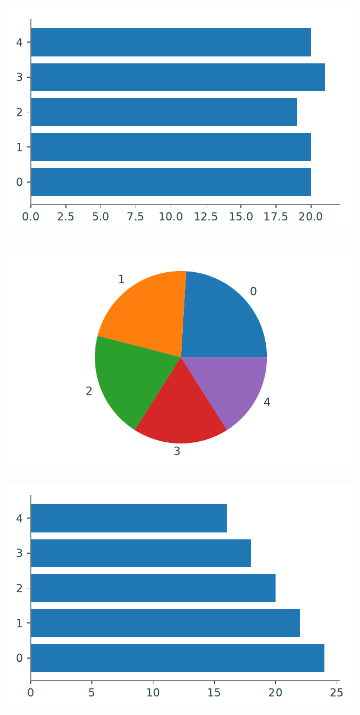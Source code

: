 \begin{figure}[H]
\begin{subfigure}{.49\textwidth}
    \end{subfigure}
    \begin{subfigure}{.49\textwidth}
        \centering
        \includegraphics[width=\textwidth]{figures/piebar2.pdf}
    \end{subfigure}
    \begin{subfigure}{.49\textwidth}
        \centering
        \includegraphics[width=\textwidth]{figures/piechart3.pdf}
    \end{subfigure}
    \begin{subfigure}{.49\textwidth}
        \centering
        \includegraphics[width=\textwidth]{figures/piebar3.pdf}

\end{subfigure}
\end{figure}
